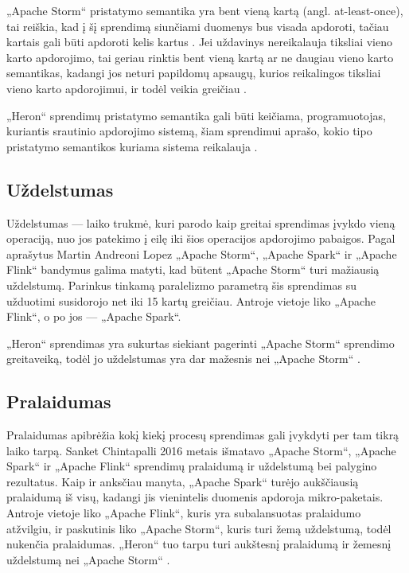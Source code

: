 \documentclass{VUMIFPSbakalaurinis}
\begin{document}
„Apache Storm“ pristatymo semantika yra bent vieną kartą (angl. at-least-once), tai reiškia, kad į šį sprendimą siunčiami duomenys bus visada apdoroti, tačiau kartais gali būti apdoroti kelis kartus \cite{prithi20}. Jei uždavinys nereikalauja tiksliai vieno karto apdorojimo, tai geriau rinktis bent vieną kartą ar ne daugiau vieno karto semantikas, kadangi jos neturi papildomų apsaugų, kurios reikalingos tiksliai vieno karto apdorojimui, ir todėl veikia greičiau \cite{zhang20}. \par

„Heron“ sprendimų pristatymo semantika gali būti keičiama, programuotojas, kuriantis srautinio apdorojimo sistemą, šiam sprendimui aprašo, kokio tipo pristatymo semantikos kuriama sistema reikalauja \cite{delivery-semantics}.

\subsection{Uždelstumas}

Uždelstumas — laiko trukmė, kuri parodo kaip greitai sprendimas įvykdo vieną operaciją, nuo jos patekimo į eilę iki šios operacijos apdorojimo pabaigos. Pagal \cite{Lopez2016APC} aprašytus Martin Andreoni Lopez „Apache Storm“, „Apache Spark“ ir „Apache Flink“ bandymus galima matyti, kad būtent „Apache Storm“ turi mažiausią uždelstumą. Parinkus tinkamą paralelizmo parametrą šis sprendimas su užduotimi susidorojo net iki 15 kartų greičiau. Antroje vietoje liko „Apache Flink“, o po jos — „Apache Spark“. \par

„Heron“ sprendimas yra sukurtas siekiant pagerinti „Apache Storm“ sprendimo greitaveiką, todėl jo uždelstumas yra dar mažesnis nei „Apache Storm“ \cite{Kulkarni:2015:THS:2723372.2742788}.

\subsection{Pralaidumas}

Pralaidumas apibrėžia kokį kiekį procesų sprendimas gali įvykdyti per tam tikrą laiko tarpą. Sanket Chintapalli 2016 metais išmatavo „Apache Storm“, „Apache Spark“ ir „Apache Flink“ sprendimų pralaidumą ir uždelstumą bei palygino rezultatus. Kaip ir anksčiau manyta, „Apache Spark“ turėjo aukščiausią pralaidumą iš visų, kadangi jis vienintelis duomenis apdoroja mikro-paketais\cite{chintapalli2016benchmarking}. Antroje vietoje liko „Apache Flink“, kuris yra subalansuotas pralaidumo atžvilgiu, ir paskutinis liko „Apache Storm“, kuris turi žemą uždelstumą, todėl nukenčia pralaidumas. „Heron“ tuo tarpu turi aukštesnį pralaidumą ir žemesnį uždelstumą nei „Apache Storm“ \cite{TwitterHeron}. 
\end{document}
